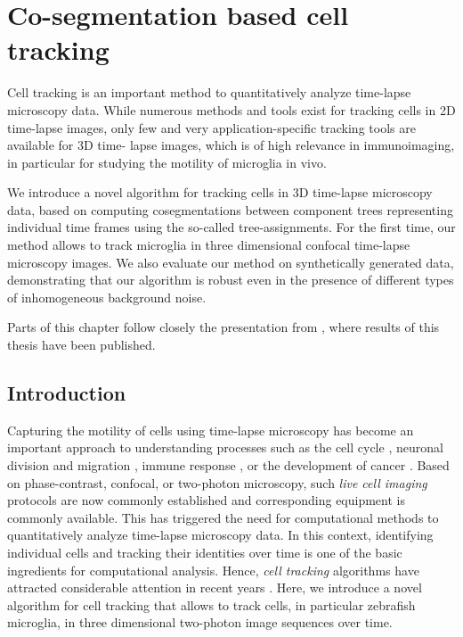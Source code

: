 \chapter{Co-segmentation based cell tracking} \label{chpt:coseg}
Cell tracking is an important method to quantitatively analyze time-lapse microscopy data. While numerous methods and tools exist for tracking cells in 2D time-lapse images, only few and very application-specific tracking tools are available for 3D time- lapse images, which is of high relevance in immunoimaging, in particular for studying the motility of microglia in vivo.

We introduce a novel algorithm for tracking cells in 3D time-lapse microscopy data, based on computing cosegmentations between component trees representing individual time frames using the so-called tree-assignments. For the first time, our method allows to track microglia in three dimensional confocal time-lapse microscopy images. We also evaluate our method on synthetically generated data, demonstrating that our algorithm is robust even in the presence of different types of inhomogeneous background noise.

Parts of this chapter follow closely the presentation from \cite{Xiao:2011}, where results of this thesis have been published.

\section{Introduction}

Capturing the motility of cells using time-lapse microscopy has become
an important approach to understanding processes such as the cell
cycle \cite{Harder:09}, neuronal division and migration
\cite{Norden:09}, immune response \cite{Cahalan:08}, or the
development of cancer \cite{Ianzini:09}. Based on phase-contrast,
confocal, or two-photon microscopy, such \emph{live cell imaging}
protocols are now commonly established and corresponding equipment is
commonly available. This has triggered the need for computational
methods to quantitatively analyze time-lapse microscopy data. In this
context, identifying individual cells and tracking their identities
over time is one of the basic ingredients for computational
analysis. Hence, \emph{cell tracking} algorithms have attracted
considerable attention in recent years
\cite{Meijering:06,Miura:05}. Here, we introduce a novel algorithm
for cell tracking that allows to track cells, in particular zebrafish
microglia, in three dimensional two-photon image sequences over time.

